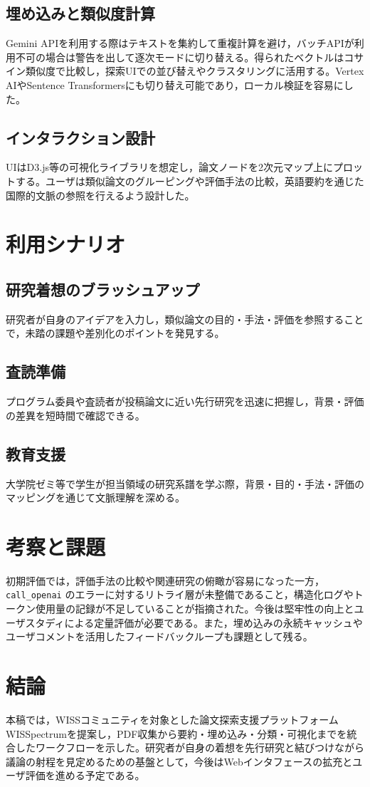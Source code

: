 \documentclass[twoside]{wiss}
\begin{document}
\subsection{埋め込みと類似度計算}
Gemini APIを利用する際はテキストを集約して重複計算を避け，バッチAPIが利用不可の場合は警告を出して逐次モードに切り替える。得られたベクトルはコサイン類似度で比較し，探索UIでの並び替えやクラスタリングに活用する。Vertex AIやSentence Transformersにも切り替え可能であり，ローカル検証を容易にした。

\subsection{インタラクション設計}
UIはD3.js等の可視化ライブラリを想定し，論文ノードを2次元マップ上にプロットする。ユーザは類似論文のグルーピングや評価手法の比較，英語要約を通じた国際的文脈の参照を行えるよう設計した。

\section{利用シナリオ}
\subsection{研究着想のブラッシュアップ}
研究者が自身のアイデアを入力し，類似論文の目的・手法・評価を参照することで，未踏の課題や差別化のポイントを発見する。

\subsection{査読準備}
プログラム委員や査読者が投稿論文に近い先行研究を迅速に把握し，背景・評価の差異を短時間で確認できる。

\subsection{教育支援}
大学院ゼミ等で学生が担当領域の研究系譜を学ぶ際，背景・目的・手法・評価のマッピングを通じて文脈理解を深める。

\section{考察と課題}
初期評価では，評価手法の比較や関連研究の俯瞰が容易になった一方， \texttt{call\_openai} のエラーに対するリトライ層が未整備であること，構造化ログやトークン使用量の記録が不足していることが指摘された。今後は堅牢性の向上とユーザスタディによる定量評価が必要である。また，埋め込みの永続キャッシュやユーザコメントを活用したフィードバックループも課題として残る。

\section{結論}
本稿では，WISSコミュニティを対象とした論文探索支援プラットフォームWISSpectrumを提案し，PDF収集から要約・埋め込み・分類・可視化までを統合したワークフローを示した。研究者が自身の着想を先行研究と結びつけながら議論の射程を見定めるための基盤として，今後はWebインタフェースの拡充とユーザ評価を進める予定である。
\end{document}
